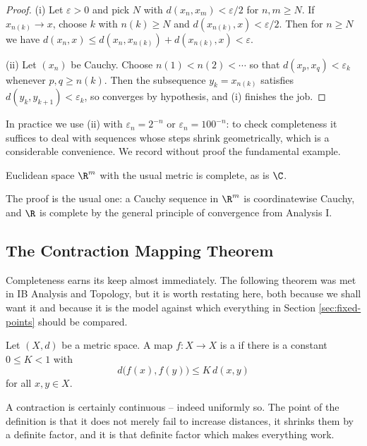 \begin{proof}
	(i) Let $\varepsilon > 0$ and pick $N$ with $d(x_n,x_m) < \varepsilon/2$ for $n,m \geq N$. If $x_{n(k)} \to x$, choose $k$ with $n(k) \geq N$ and $d(x_{n(k)}, x) < \varepsilon/2$. Then for $n \geq N$ we have $d(x_n, x) \leq d(x_n, x_{n(k)}) + d(x_{n(k)},x) < \varepsilon$.

	(ii) Let $(x_n)$ be Cauchy. Choose $n(1) < n(2) < \cdots$ so that $d(x_p, x_q) < \varepsilon_k$ whenever $p,q \geq n(k)$. Then the subsequence $y_k = x_{n(k)}$ satisfies $d(y_k,y_{k+1}) < \varepsilon_k$, so converges by hypothesis, and (i) finishes the job. \qedhere
\end{proof}

In practice we use (ii) with $\varepsilon_n = 2^{-n}$ or $\varepsilon_n = 100^{-n}$: to check completeness it suffices to deal with sequences whose steps shrink geometrically, which is a considerable convenience. We record without proof the fundamental example.

\begin{theorem}
	Euclidean space $\R^m$ with the usual metric is complete, as is $\C$.
\end{theorem}

The proof is the usual one: a Cauchy sequence in $\R^m$ is coordinatewise Cauchy, and $\R$ is complete by the general principle of convergence from Analysis I.

\subsection{The Contraction Mapping Theorem}

Completeness earns its keep almost immediately. The following theorem was met in IB Analysis and Topology, but it is worth restating here, both because we shall want it and because it is the model against which everything in Section \ref{sec:fixed-points} should be compared.

\begin{definition}[Contraction]
	Let $(X,d)$ be a metric space. A map $f : X \to X$ is a  if there is a constant $0 \leq K < 1$ with
	$$d\big(f(x),f(y)\big) \leq K\,d(x,y)$$
	for all $x,y\in X$.
\end{definition}

A contraction is certainly continuous -- indeed uniformly so. The point of the definition is that it does not merely fail to increase distances, it shrinks them by a definite factor, and it is that definite factor which makes everything work.

